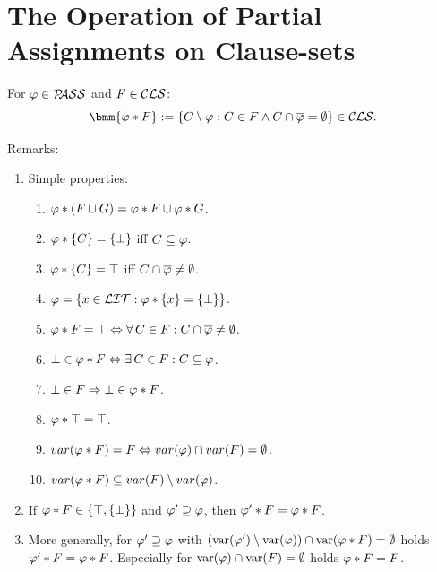 \documentclass[12pt]{book}
\begin{document}
\section{The Operation of Partial Assignments on Clause-sets}
\label{sec:oppasscls}

\begin{defi}\label{def:oppassCls}
  For $\varphi \in \mathcal{P\hspace{-0.32em}ASS}$ and $F \in \mathcal{CLS}$:
  \begin{displaymath}
    \bmm{\vp * F} := \set{C \sm \vp : C \in F \wedge C \cap \ol{\vp} = \es} \in \Cls.
  \end{displaymath}
\end{defi}
Remarks:
\begin{enumerate}
\item Simple properties:
  \begin{enumerate}
  \item $\varphi * (F \cup G) = \varphi * F \cup \varphi * G$.
  \item $\varphi * \{ C \} = \{ \bot \}$ iff $C \subseteq \varphi$.
  \item $\varphi * \{ C \} = \top$ iff $C \cap \overline{\varphi} \ne \emptyset$.
  \item $\varphi = \{ x \in \mathcal{LIT} : \varphi * \{ x \} = \{ \bot \} \}$.
  \item $\varphi * F = \top \Leftrightarrow \forall\, C \in F : C \cap \overline{\varphi} \ne \emptyset$.
  \item $\bot \in \varphi * F \Leftrightarrow \exists\, C \in F : C \subseteq \varphi$.
  \item $\bot \in F \Rightarrow \bot \in \varphi * F$.
  \item $\varphi * \top = \top$.
  \item $ var(\varphi * F) = F \Leftrightarrow var(\varphi) \cap var(F) = \emptyset$.
  \item $ var(\varphi * F) \subseteq var(F) \setminus var(\varphi)$.
  \end{enumerate}
\item If $\varphi * F \in \{ \top, \{ \bot \} \}$ and $\varphi' \supseteq \varphi$, then $\varphi' * F = \varphi * F$.
\item More generally, for $\varphi' \supseteq \varphi$ with $(\operatorname{var}(\varphi') \setminus \operatorname{var}(\varphi)) \cap \operatorname{var}(\varphi * F) = \emptyset$ holds $\varphi' * F = \varphi * F$. Especially for $\operatorname{var}(\varphi) \cap \operatorname{var}(F) = \emptyset$ holds $\varphi * F = F$.
\end{enumerate}
\end{document}
